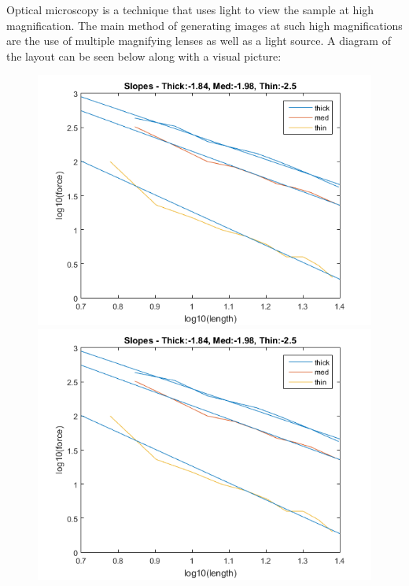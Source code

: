 \documentclass{article}
\begin{document}
Optical microscopy is a technique that uses light to view the sample at high magnification. The main method of generating images at such high magnifications are the use of multiple magnifying lenses as well as a light source. A diagram of the layout can be seen below along with a visual picture:

\begin{figure}[h]
	\begin{minipage}{.5\textwidth}
		\centering
		\includegraphics[scale=.3]{Lab1f1.png}
	\end{minipage}		
	\begin{minipage}{.5\textwidth}
		\centering
		\includegraphics[scale=.3]{Lab1f1.png}
	\end{minipage}
\end{figure}
\end{document}
